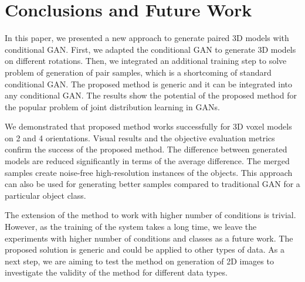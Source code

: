 \documentclass[runningheads]{llncs}
\begin{document}
\section{Conclusions and Future Work}
\label{sect:conc}

In this paper, we presented a new approach to generate paired 3D models with conditional GAN. First, we adapted the conditional GAN to generate 3D models on different rotations. Then, we integrated an additional training step to solve problem of generation of pair samples, which is a shortcoming of standard conditional GAN. The proposed method is generic and it can be integrated into any conditional GAN. The results show the potential of the proposed method for the popular problem of joint distribution learning in GANs.

We demonstrated that proposed method works successfully for 3D voxel models on 2 and 4 orientations. Visual results and the objective evaluation metrics confirm the success of the proposed method. The difference between generated models are reduced significantly in terms of the average difference. The merged samples create noise-free high-resolution instances of the objects. This approach can also be used for generating better samples compared to traditional GAN for a particular object class. 

The extension of the method to work with higher number of conditions is trivial. However, as the training of the system takes a long time, we leave the experiments with higher number of conditions and classes as a future work. The proposed solution is generic and could be applied to other types of data. As a next step, we are aiming to test the method on generation of 2D images to investigate the validity of the method for different data types.
\end{document}
